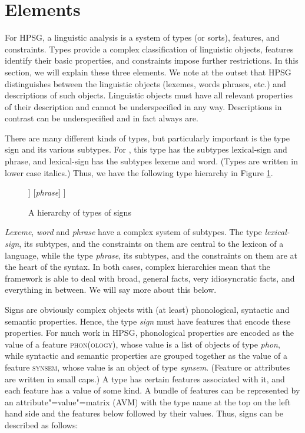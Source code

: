\documentclass[output=paper
	        ,collection
	        ,collectionchapter
 	        ,biblatex
                ,babelshorthands
                ,newtxmath
                ,draftmode
                ,colorlinks, citecolor=brown
]{langscibook}
\begin{document}
\section{Elements}

For HPSG, a linguistic analysis is a system of types (or sorts), features, and constraints. Types provide a complex classification of linguistic objects, features identify their basic properties, and constraints impose further restrictions. In this section, we will explain these three elements. We note at the outset that HPSG distinguishes between the linguistic objects (lexemes, words phrases, etc.) and descriptions of such objects. Linguistic objects must have all relevant properties of their description and cannot be underspecified in any way. Descriptions in contrast can be underspecified and in fact always are.

There are many different kinds of types, but particularly important is the type sign and its various subtypes. For \citet[19]{GSag2000a-u}, this type has the subtypes lexical-sign and phrase, and lexical-sign has the subtypes lexeme and word. (Types are written in lower case italics.) Thus, we have the following type hierarchy in Figure \ref{fig:prop1}.


\begin{figure}[h!]
\begin{forest}
[\emph{sign}
	[\emph{lexical-sign}
		[\emph{lexeme}]
		[\emph{word}]
	]
	[\emph{phrase}]
]
\end{forest}

\caption{A hierarchy of types of signs}\label{fig:prop1}
\end{figure}


\emph{Lexeme}, \emph{word} and \emph{phrase} have a complex system of subtypes. The type \emph{lexical-sign}, its subtypes, and the constraints on them are central to the lexicon of a language, while the type \emph{phrase}, its subtypes, and the constraints on them are at the heart of the syntax. In both cases, complex hierarchies mean that the framework is able to deal with broad, general facts, very idiosyncratic facts, and everything in between. We will say more about this below.

Signs are obviously complex objects with (at least) phonological, syntactic and semantic properties. Hence, the type \emph{sign} must have features that encode these properties. For much work in HPSG, phonological properties are encoded as the value of a feature \textsc{phon(ology)}, whose value is a list of objects of type \emph{phon}, while syntactic and semantic properties are grouped together as the value of a feature \textsc{synsem}, whose value is an object of type \emph{synsem}. (Feature or attributes are written in small caps.) A type has certain features associated with it, and each feature has a value of some kind. A bundle of features can be represented by an attribute"=value"=matrix (AVM) with the type name at the top on the left hand side and the features below followed by their values. Thus, signs can be described as follows:
\end{document}
